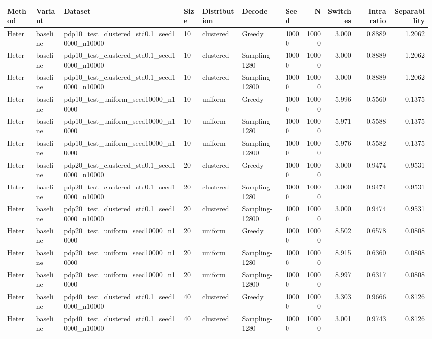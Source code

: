 \begin{tabular}{lllllllrrrr}\toprule
Method & Variant & Dataset & Size & Distribution & Decode & Seed & N & Switches & Intra ratio & Separability \\
\midrule
Heter & baseline & pdp10_test_clustered_std0.1_seed10000_n10000 & 10 & clustered & Greedy & 10000 & 10000 & 3.000 & 0.8889 & 1.2062 \\
Heter & baseline & pdp10_test_clustered_std0.1_seed10000_n10000 & 10 & clustered & Sampling-1280 & 10000 & 10000 & 3.000 & 0.8889 & 1.2062 \\
Heter & baseline & pdp10_test_clustered_std0.1_seed10000_n10000 & 10 & clustered & Sampling-12800 & 10000 & 10000 & 3.000 & 0.8889 & 1.2062 \\
Heter & baseline & pdp10_test_uniform_seed10000_n10000 & 10 & uniform & Greedy & 10000 & 10000 & 5.996 & 0.5560 & 0.1375 \\
Heter & baseline & pdp10_test_uniform_seed10000_n10000 & 10 & uniform & Sampling-1280 & 10000 & 10000 & 5.971 & 0.5588 & 0.1375 \\
Heter & baseline & pdp10_test_uniform_seed10000_n10000 & 10 & uniform & Sampling-12800 & 10000 & 10000 & 5.976 & 0.5582 & 0.1375 \\
Heter & baseline & pdp20_test_clustered_std0.1_seed10000_n10000 & 20 & clustered & Greedy & 10000 & 10000 & 3.000 & 0.9474 & 0.9531 \\
Heter & baseline & pdp20_test_clustered_std0.1_seed10000_n10000 & 20 & clustered & Sampling-1280 & 10000 & 10000 & 3.000 & 0.9474 & 0.9531 \\
Heter & baseline & pdp20_test_clustered_std0.1_seed10000_n10000 & 20 & clustered & Sampling-12800 & 10000 & 10000 & 3.000 & 0.9474 & 0.9531 \\
Heter & baseline & pdp20_test_uniform_seed10000_n10000 & 20 & uniform & Greedy & 10000 & 10000 & 8.502 & 0.6578 & 0.0808 \\
Heter & baseline & pdp20_test_uniform_seed10000_n10000 & 20 & uniform & Sampling-1280 & 10000 & 10000 & 8.915 & 0.6360 & 0.0808 \\
Heter & baseline & pdp20_test_uniform_seed10000_n10000 & 20 & uniform & Sampling-12800 & 10000 & 10000 & 8.997 & 0.6317 & 0.0808 \\
Heter & baseline & pdp40_test_clustered_std0.1_seed10000_n10000 & 40 & clustered & Greedy & 10000 & 10000 & 3.303 & 0.9666 & 0.8126 \\
Heter & baseline & pdp40_test_clustered_std0.1_seed10000_n10000 & 40 & clustered & Sampling-1280 & 10000 & 10000 & 3.001 & 0.9743 & 0.8126 \\

\end{tabular}
